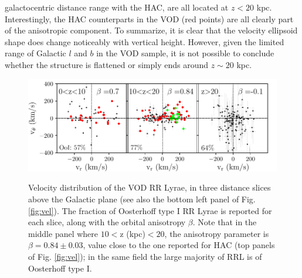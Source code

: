 \documentclass[fleqn,usenatbib]{mnras}
\begin{document}
galactocentric distance range with the HAC, are all located at $z<20$
kpc. Interestingly, the HAC counterparts in the VOD (red points) are
all clearly part of the anisotropic component. To summarize, it is
clear that the velocity ellipsoid shape does change noticeably with
vertical height. However, given the limited range of Galactic $l$ and
$b$ in the VOD sample, it is not possible to conclude whether the
structure is flattened or simply ends around $z\sim20$ kpc.
%   
%
\begin{figure}
	        \includegraphics[scale=0.55]{VOD_velocities_vphi_zcuts.pdf}\\
\vspace{-0.45cm}
   \caption{Velocity distribution of the VOD RR Lyrae, in three distance slices above the Galactic plane (see also the bottom left panel of Fig. 
   \ref{fig:vel}). The fraction of Oosterhoff type I RR Lyrae is reported for each slice, along with the orbital anisotropy $\beta$. Note that in the middle panel where $10<$z (kpc)$<20$, the anisotropy parameter is $\beta=0.84\pm0.03$, value close to the one reported for HAC (top panels of  Fig.  \ref{fig:vel}); in the same field the large majority  of RRL is of Oosterhoff type I.}
    \label{fig:VOD_vel}
\end{figure}
%
\end{document}
